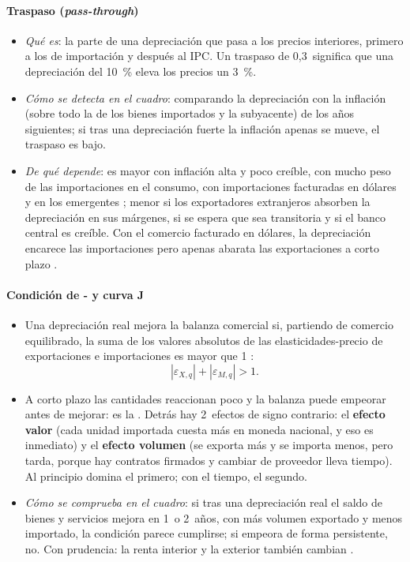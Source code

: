 \documentclass[11pt]{article}
\begin{document}
\paragraph{Traspaso (\emph{pass-through})}
\begin{itemize}
\item \emph{Qué es}: la parte de una depreciación que pasa a los precios interiores, primero a los de importación y después al IPC. Un traspaso de 0,3~significa que una depreciación del 10~\% eleva los precios un 3~\%.
\item \emph{Cómo se detecta en el cuadro}: comparando la depreciación con la inflación (sobre todo la de los bienes importados y la subyacente) de los años siguientes; si tras una depreciación fuerte la inflación apenas se mueve, el traspaso es bajo.
\item \emph{De qué depende}: es mayor con inflación alta y poco creíble, con mucho peso de las importaciones en el consumo, con importaciones facturadas en dólares y en los emergentes \parencite{Taylor2000PassThrough,CampaGoldberg2005}; menor si los exportadores extranjeros absorben la depreciación en sus márgenes, si se espera que sea transitoria y si el banco central es creíble. Con el comercio facturado en dólares, la depreciación encarece las importaciones pero apenas abarata las exportaciones a corto plazo \parencite{Gopinath2020DCP}.
\end{itemize}

\paragraph{Condición de - y curva J}
\begin{itemize}
\item Una depreciación real mejora la balanza comercial si, partiendo de comercio equilibrado, la suma de los valores absolutos de las elasticidades-precio de exportaciones e importaciones es mayor que 1 \parencite{Marshall1923,Lerner1944}:
\[
|\varepsilon_{X,q}|+|\varepsilon_{M,q}|>1 .
\]
\item A corto plazo las cantidades reaccionan poco y la balanza puede empeorar antes de mejorar: es la  \parencite{Magee1973}. Detrás hay 2~efectos de signo contrario: el \textbf{efecto valor} (cada unidad importada cuesta más en moneda nacional, y eso es inmediato) y el \textbf{efecto volumen} (se exporta más y se importa menos, pero tarda, porque hay contratos firmados y cambiar de proveedor lleva tiempo). Al principio domina el primero; con el tiempo, el segundo.
\item \emph{Cómo se comprueba en el cuadro}: si tras una depreciación real el saldo de bienes y servicios mejora en 1~o 2~años, con más volumen exportado y menos importado, la condición parece cumplirse; si empeora de forma persistente, no. Con prudencia: la renta interior y la exterior también cambian .
\end{itemize}
\end{document}
